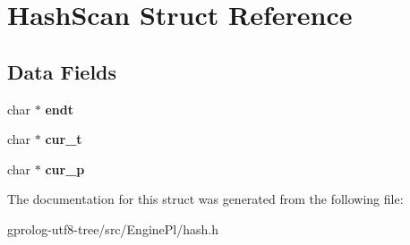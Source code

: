\hypertarget{structHashScan}{}\section{Hash\+Scan Struct Reference}
\label{structHashScan}
\subsection*{Data Fields}
\begin{DoxyCompactItemize}
\item 
char $\ast$ {\bfseries endt}\hypertarget{structHashScan_a40b9e0ec1b11cffe3e7bc2c20b7b8a4b}{}\label{structHashScan_a40b9e0ec1b11cffe3e7bc2c20b7b8a4b}

\item 
char $\ast$ {\bfseries cur\+\_\+t}\hypertarget{structHashScan_af1c9388da5931a00722e2e9ea2c10f42}{}\label{structHashScan_af1c9388da5931a00722e2e9ea2c10f42}

\item 
char $\ast$ {\bfseries cur\+\_\+p}\hypertarget{structHashScan_a267d5612893c8faa728cb27e1edd21aa}{}\label{structHashScan_a267d5612893c8faa728cb27e1edd21aa}

\end{DoxyCompactItemize}


The documentation for this struct was generated from the following file\+:\begin{DoxyCompactItemize}
\item 
gprolog-\/utf8-\/tree/src/\+Engine\+Pl/hash.\+h\end{DoxyCompactItemize}
